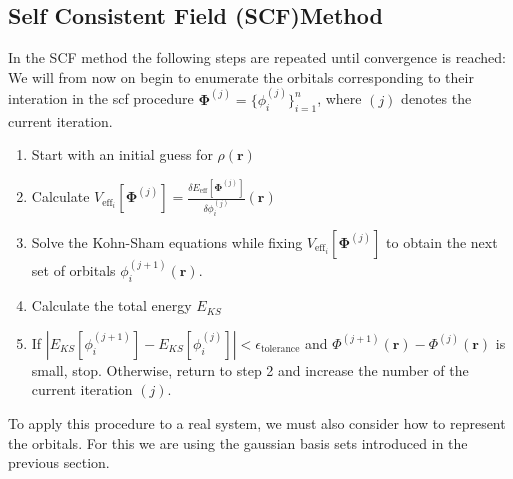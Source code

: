 \subsection{Self Consistent Field (SCF)Method}
In the SCF method the following steps are repeated until convergence is reached:
We will from now on begin to enumerate the orbitals corresponding to their interation in the scf procedure $\mathbf{\Phi}^{(j)} = \{\phi_i^{(j)}\}_{i=1}^n$, where $(j)$ denotes the current iteration.
\begin{enumerate}
    \item Start with an initial guess for $\rho(\mathbf{r})$
    \item Calculate $V_\text{eff}_i[\mathbf{\Phi}^{(j)}] = \frac{\delta E_\text{eff}[\mathbf{\Phi}^{(j)}]}{\delta \phi_i^{(j)}}(\mathbf{r})$
    \item Solve the Kohn-Sham equations while fixing $V_\text{eff}_i[\mathbf{\Phi}^{(j)}]$ to obtain the next set of orbitals $\phi_i^{(j+1)}(\mathbf{r})$.
    \item Calculate the total energy $E_{KS}$
    \item If $|E_{KS}[\phi_i^{(j+1)}] - E_{KS}[\phi_i^{(j)}]| < \epsilon_\text{tolerance}$ and $\Phi^{(j+1)}(\mathbf{r})-\Phi^{(j)}(\mathbf{r})$ is small, stop. Otherwise, return to step 2 and increase the number of the current iteration $(j)$.
\end{enumerate}
To apply this procedure to a real system, we must also consider how to represent the orbitals. For this we are using the gaussian basis sets introduced in the previous section.



















